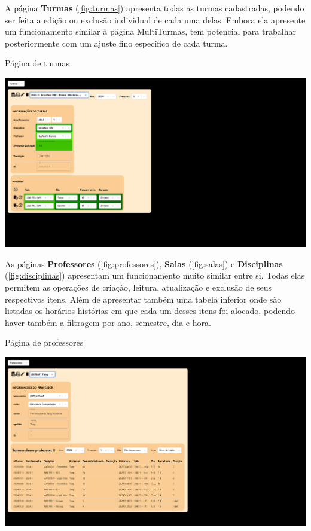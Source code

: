 A página \textbf{Turmas} (\autoref{fig:turmas}) apresenta todas as turmas cadastradas, podendo ser feita a edição ou exclusão individual de cada uma delas. Embora ela apresente um funcionamento similar à página MultiTurmas, tem potencial para trabalhar posteriormente com um ajuste fino específico de cada turma.

\begin{MyCenteredFigure} \caption{Página de turmas} \label{fig:turmas}
  \includegraphics[width=\textwidth]{files/img/2.02!7-resultados/6-Turmas.png}
\end{MyCenteredFigure}

As páginas \textbf{Professores} (\autoref{fig:professores}), \textbf{Salas} (\autoref{fig:salas}) e \textbf{Disciplinas} (\autoref{fig:disciplinas}) apresentam um funcionamento muito similar entre si. Todas elas permitem as operações de criação, leitura, atualização e exclusão de seus respectivos itens. Além de apresentar também uma tabela inferior onde são listadas os horários histórias em que cada um desses itens foi alocado, podendo haver também a filtragem por ano, semestre, dia e hora.

\begin{MyCenteredFigure} \caption{Página de professores} \label{fig:professores}
  \includegraphics[width=\textwidth]{files/img/2.02!7-resultados/7-Professores.png}
\end{MyCenteredFigure}

